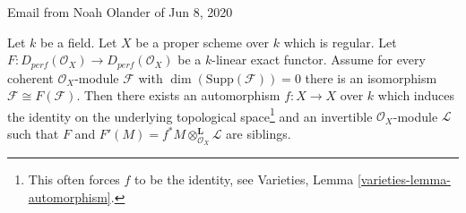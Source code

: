 \begin{lemma}
\label{lemma-noah}
\begin{reference}
Email from Noah Olander of Jun 8, 2020
\end{reference}
Let $k$ be a field. Let $X$ be a proper scheme over $k$ which is regular.
Let $F : D_{perf}(\mathcal{O}_X) \to D_{perf}(\mathcal{O}_X)$
be a $k$-linear exact functor. Assume for every coherent
$\mathcal{O}_X$-module $\mathcal{F}$ with $\dim(\text{Supp}(\mathcal{F})) = 0$
there is an isomorphism $\mathcal{F} \cong F(\mathcal{F})$.
Then there exists an automorphism $f : X \to X$ over $k$
which induces the identity on the
underlying topological space\footnote{This often forces $f$
to be the identity, see Varieties, Lemma \ref{varieties-lemma-automorphism}.}
and an invertible $\mathcal{O}_X$-module $\mathcal{L}$
such that $F$ and $F'(M) = f^*M \otimes_{\mathcal{O}_X}^\mathbf{L} \mathcal{L}$
are siblings.
\end{lemma}


